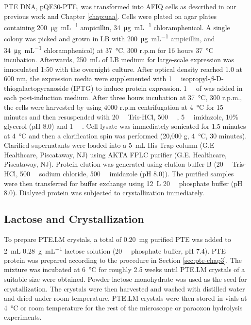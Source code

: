 \begin{refsection}
PTE DNA, pQE30-PTE, was transformed into AFIQ cells as described in our previous
work\cite{Yang2014a} and Chapter \ref{chap:uaa}. Cells were plated on agar
plates containing \SI{200}{\ug\per\mL} ampicillin, \SI{34}{\ug\per\mL}
chloramphenicol. A single colony was picked and grown in LB with
\SI{200}{\ug\per\mL} ampicillin, and \SI{34}{\ug\per\mL} chloramphenicol) at
\SI{37}{\celsius}, 300 r.p.m for 16 hours \SI{37}{\celsius} incubation.
Afterwards, \SI{250}{\mL} of LB medium for large-scale expression was
innoculated 1:50 with the overnight culture.  After optical density reached 1.0
at 600 nm, the expression media were supplemented with \SI{1}{\milli\Molar}
isopropyl-$\beta$-D-thiogalactopyranoside (IPTG) to induce protein expression.
\SI{1}{\milli\Molar} of  was added in each post-induction medium.
After three hours incubation at \SI{37}{\celsius}, 300 r.p.m., the cells were
harvested by using 4000 r.p.m centrifugation at \SI{4}{\celsius} for 15 minutes
and then resuspended with \SI{20}{\milli\Molar} Tris-HCl,
\SI{500}{\milli\Molar} , \SI{5}{\milli\Molar} imidazole, 10\% glycerol
(pH 8.0) and \SI{1}{\micro\Molar} . Cell lysate was immediately
sonicated for 1.5 minutes at \SI{4}{\celsius} and then a clarification spin was
performed (20,000 g, \SI{4}{\celsius}, 30 minutes).  Clarified supernatants
were loaded into a \SI{5}{\mL} His Trap column (G.E Healthcare, Piscataway, NJ)
using AKTA FPLC purifier (G.E.  Healthcare, Piscataway, NJ).  Protein elution
was generated using elution buffer B (\SI{20}{\milli\Molar} Tris-HCl,
\SI{500}{\milli\Molar} sodium chloride, \SI{500}{\milli\Molar} imidazole (pH
8.0)).  The purified samples were then transferred for buffer exchange using
\SI{12}{\L} \SI{20}{\milli\Molar} phosphate buffer (pH 8.0).  Dialyzed protein
was subjected to crystallization immediately.

\subsection{Lactose and Crystallization}

To prepare PTE.LM crystals, a total of \SI{0.20}{\milli\gram} purified PTE was
added to \SI{2}{\mL} \SI{0.28}{\gram\per\mL} lactose solution
(\SI{20}{\milli\Molar} phosphate buffer, pH 7.4).  PTE protein was prepared
according to the procedure in Section \ref{sec:pte-chap3}. The mixture was
incubated at \SI{6}{\celsius} for roughly 2.5 weeks until PTE.LM crystals of a
suitable size were obtained.  Powder lactose monohydrate was used as the seed
for crystallization. The crystals were then harvested and washed with distilled
water and dried under room temperature. PTE.LM crystals were then stored in
vials at \SI{4}{\celsius} or room temperature for the rest of the microscope or
paraoxon hydrolysis experiments.


\end{refsection}
